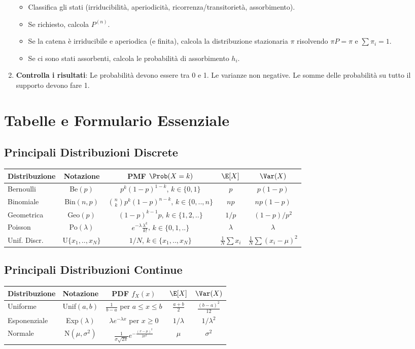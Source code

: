 \begin{enumerate}
\begin{itemize}
            \item Classifica gli stati (irriducibilità, aperiodicità, ricorrenza/transitorietà, assorbimento).
            \item Se richiesto, calcola $P^{(n)}$.
            \item Se la catena è irriducibile e aperiodica (e finita), calcola la distribuzione stazionaria $\pi$ risolvendo $\pi P = \pi$ e $\sum \pi_i = 1$.
            \item Se ci sono stati assorbenti, calcola le probabilità di assorbimento $h_i$.
        \end{itemize}
    \item \textbf{Controlla i risultati}: Le probabilità devono essere tra 0 e 1. Le varianze non negative. Le somme delle probabilità su tutto il supporto devono fare 1.
\end{enumerate}

\appendix
\chapter{Tabelle e Formulario Essenziale}
\section{Principali Distribuzioni Discrete}
\begin{tabular}{|l|c|c|c|c|}
\hline
Distribuzione & Notazione & PMF $\Prob(X=k)$ & $\E[X]$ & $\Var(X)$ \\ \hline
Bernoulli & Be$(p)$ & $p^k(1-p)^{1-k}$, $k \in \{0,1\}$ & $p$ & $p(1-p)$ \\ \hline
Binomiale & Bin$(n,p)$ & $\binom{n}{k}p^k(1-p)^{n-k}$, $k \in \{0,..,n\}$ & $np$ & $np(1-p)$ \\ \hline
Geometrica & Geo$(p)$ & $(1-p)^{k-1}p$, $k \in \{1,2,..\}$ & $1/p$ & $(1-p)/p^2$ \\ \hline
Poisson & Po$(\lambda)$ & $e^{-\lambda}\frac{\lambda^k}{k!}$, $k \in \{0,1,..\}$ & $\lambda$ & $\lambda$ \\ \hline
Unif. Discr. & U$\{x_1,..,x_N\}$ & $1/N$, $k \in \{x_1,..,x_N\}$ & $\frac{1}{N}\sum x_i$ & $\frac{1}{N}\sum (x_i-\mu)^2$ \\ \hline
\end{tabular}

\section{Principali Distribuzioni Continue}
\begin{tabular}{|l|c|c|c|c|}
\hline
Distribuzione & Notazione & PDF $f_X(x)$ & $\E[X]$ & $\Var(X)$ \\ \hline
Uniforme & Unif$(a,b)$ & $\frac{1}{b-a}$ per $a \le x \le b$ & $\frac{a+b}{2}$ & $\frac{(b-a)^2}{12}$ \\ \hline
Esponenziale & Exp$(\lambda)$ & $\lambda e^{-\lambda x}$ per $x \ge 0$ & $1/\lambda$ & $1/\lambda^2$ \\ \hline
Normale & N$(\mu, \sigma^2)$ & $\frac{1}{\sigma\sqrt{2\pi}}e^{-\frac{(x-\mu)^2}{2\sigma^2}}$ & $\mu$ & $\sigma^2$ \\ \hline
\end{tabular}

